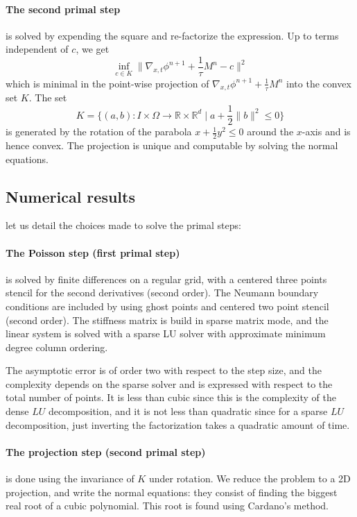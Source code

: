 \documentclass[a4paper]{article}
\theoremstyle{definition}
\theoremstyle{remark}
\newcommand{\R}{\mathbb{R}}
\begin{document}
\paragraph{The second primal step} is solved by expending the square and re-factorize the expression. Up to terms independent of $c$, we get
$$\inf_{c\in K} \|\nabla_{x,t}\phi^{n+1} + \frac{1}{\tau}M^{n}-c\|^2$$
which is minimal in the point-wise projection of $\nabla_{x,t}\phi^{n+1} + \frac{1}{\tau}M^{n}$ into the convex set $K$. The set
$$K = \{(a,b):I\times\Omega\to\R\times\R^d \;|\;  a + \frac12\|b\|^2 \leq 0 \}$$
is generated by the rotation of the parabola $x + \frac12y^2 \leq 0$ around the $x$-axis and is hence convex. The projection is unique and computable by solving the normal equations.



\subsection{Numerical results}
let us detail the choices made to solve the primal steps:
\paragraph{The Poisson step (first primal step)} is solved by finite differences on a regular grid, with a centered three points stencil for the second derivatives (second order). The Neumann boundary conditions are included by using ghost points and centered two point stencil (second order). The stiffness matrix is build in sparse matrix mode, and the linear system is solved with a sparse LU solver with approximate minimum degree column ordering.

The asymptotic error is of order two with respect to the step size, and the complexity depends on the sparse solver and is expressed with respect to the total number of points. It is less than cubic since this is the complexity of the  dense $LU$ decomposition, and it is not less than quadratic since for a sparse $LU$ decomposition, just inverting the factorization takes a quadratic amount of time.

\paragraph{The projection step (second primal step)} is done using the invariance of $K$ under rotation. We reduce the problem to a 2D projection, and write the normal equations: they consist of finding the biggest real root of a cubic polynomial. This root is found using Cardano's method.
\end{document}

